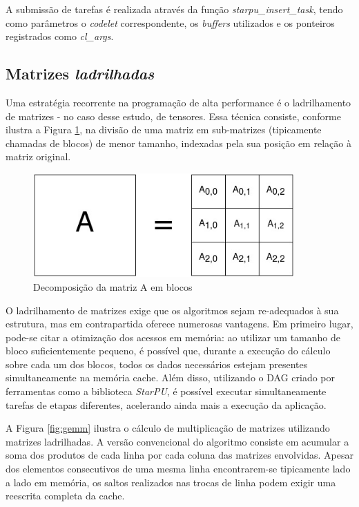 \documentclass[cic,tc]{iiufrgs}
\begin{document}
A submissão de tarefas é realizada através da função \textit{starpu\_insert\_task}, tendo como parâmetros o \textit{codelet} correspondente, os \textit{buffers} utilizados e
os ponteiros registrados como \textit{cl\_args}. 

\subsection{Matrizes \textit{ladrilhadas}}

Uma estratégia recorrente na programação de alta performance é o ladrilhamento de matrizes - no caso desse estudo, de tensores. Essa técnica consiste, conforme ilustra a Figura \ref{fig:tiled_matrix},
na divisão de uma matriz em sub-matrizes (tipicamente chamadas de blocos) de menor tamanho, indexadas pela sua posição em relação à matriz original.

\begin{figure}[!htb]
    \caption{Decomposição da matriz A em blocos}
    \begin{center}
      \includegraphics[width=27em]{tiled_matrix}
    \end{center}
    \label{fig:tiled_matrix}
\end{figure}

O ladrilhamento de matrizes exige que os algoritmos sejam re-adequados à sua estrutura, mas em contrapartida oferece numerosas vantagens. Em primeiro lugar, pode-se citar a
otimização dos acessos em memória: ao utilizar um tamanho de bloco suficientemente pequeno, é possível que, durante a execução do cálculo sobre cada um dos blocos, todos os dados
necessários estejam presentes simultaneamente na memória cache. Além disso, utilizando o DAG criado por ferramentas como a biblioteca \textit{StarPU}, é possível executar
simultaneamente tarefas de etapas diferentes, acelerando ainda mais a execução da aplicação.

A Figura \ref{fig:gemm} ilustra o cálculo de multiplicação de matrizes utilizando matrizes ladrilhadas. A versão convencional do algoritmo consiste em acumular a soma dos produtos de
cada linha por cada coluna das matrizes envolvidas. Apesar dos elementos consecutivos de uma mesma linha encontrarem-se tipicamente lado a lado em memória, os saltos realizados nas trocas
de linha podem exigir uma reescrita completa da cache.
\end{document}
